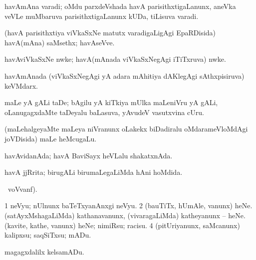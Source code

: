 {\bentry
{} 
\gl{\nA}
\expl{}
\bmng
havAmAna varadi; oMdu parxdeVshada havA parisithxtigaLanunx, aneVka veVLe muMbaruva parisithxtigaLanunx kUDa, tiLisuva varadi. 
\emng
\eentry

\bentry
{} 
\gl{\nA}
\expl{}
\bmng
(havA parisithxtiya viVkaSxNe matutx varadigaLigAgi EpaRDisida) havA(mAna) saMsethx; havAseVve. 
\emng
\eentry

\bentry
{} 
\gl{\nA}
\expl{}
\bmng
havAviVkaSxNe nwke; havA(mAnada viVkaSxNegAgi iTiTxruva) nwke. 
\emng
\eentry

\bentry
{} 
\gl{\nA}
\expl{}
\bmng
havAmAnada (viVkaSxNegAgi yA adara mAhitiya dAKlegAgi sAthxpisiruva) keVMdarx. 
\emng
\eentry

\bentry
{} 
\gl{\nA}
\expl{}
\bmng
maLe yA gALi taDe; bAgilu yA kiTkiya mUlka maLeniVru yA gALi, oLanugagxdaMte taDeyalu baLasuva, yAvudeV vasutxvina cUru. 
\emng
\eentry

\bentry
{} 
\gl{\nA}
\expl{}
\bmng
(maLehalgeyaMte maLeya niVranunx oLakekx biDadiralu oMdarameVloMdAgi joVDisida) maLe heMcugaLu. 
\emng
\eentry

\bentry
{} 
\gl{\nA}
\expl{}
\bmng
{} 
\emng
\eentry

\bentry
{} 
\gl{\gu}
\expl{}
\bmng
havAvidanAda; havA BaviSayx heVLalu shakatxnAda. 
\emng
\eentry

\bentry
{} 
\gl{\gu}
\expl{}
\bmng
havA jjRrita; birugALi birumaLegaLiMda hAni hoMdida. 
\emng
\eentry

\bentry
{} 
\gl{\kirx}
 \ucAcx\ voVvanf).

\noindent
\gl{\sakirx}
\bmng
\bnum
\num{1} neVyu; nUlnunx baTeTxyanAnxgi neVyu. 
\num{2} (bauTiTx, hUmAle, \mo vanunx) heNe. 
\banum
{} (satAyxMshagaLiMda) kathanavanunx, (vivaragaLiMda) katheyanunx -- heNe. 
 (kavite, kathe, \mo vanunx) heNe; nimiRsu; racisu. 
\eanum
\numie
\num{4} (pitUriyanunx, saMcanunx) kalipxsu; saqSiTxsu; mADu. 
\enum
\emng

\noindent 
\gl{\akirx}
\expl{}
\bmng
magagxdalilx kelsamADu. 
\emng
\eentry

}
